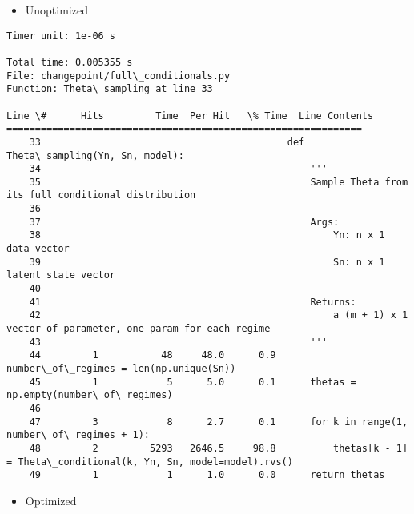\documentclass{article}
\begin{document}
    \begin{itemize}
\itemsep1pt\parskip0pt
\item
  Unoptimized
\end{itemize}


    \begin{Verbatim}[commandchars=\\\{\}]
Timer unit: 1e-06 s

Total time: 0.005355 s
File: changepoint/full\_conditionals.py
Function: Theta\_sampling at line 33

Line \#      Hits         Time  Per Hit   \% Time  Line Contents
==============================================================
    33                                           def Theta\_sampling(Yn, Sn, model):
    34                                               '''
    35                                               Sample Theta from its full conditional distribution
    36                                           
    37                                               Args:
    38                                                   Yn: n x 1 data vector
    39                                                   Sn: n x 1 latent state vector
    40                                               
    41                                               Returns:
    42                                                   a (m + 1) x 1 vector of parameter, one param for each regime
    43                                               '''
    44         1           48     48.0      0.9      number\_of\_regimes = len(np.unique(Sn))
    45         1            5      5.0      0.1      thetas = np.empty(number\_of\_regimes)
    46                                               
    47         3            8      2.7      0.1      for k in range(1, number\_of\_regimes + 1):
    48         2         5293   2646.5     98.8          thetas[k - 1] = Theta\_conditional(k, Yn, Sn, model=model).rvs()
    49         1            1      1.0      0.0      return thetas
    \end{Verbatim}

    \begin{itemize}
\itemsep1pt\parskip0pt
\item
  Optimized
\end{itemize}
\end{document}
